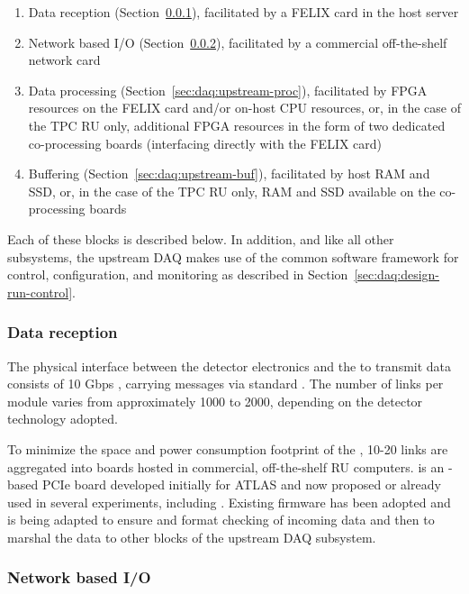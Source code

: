 \begin{enumerate}
\item Data reception (Section~\ref{sec:daq:upstream-receiver}), facilitated by a FELIX card in the host server
\item Network based I/O (Section~\ref{sec:daq:upstream-io}), facilitated by a commercial off-the-shelf network card
\item Data processing (Section~\ref{sec:daq:upstream-proc}), facilitated by FPGA resources on the FELIX
  card and/or on-host CPU resources, or, in the case of the TPC RU only,
  additional FPGA resources in the form of two dedicated co-processing
  boards (interfacing directly with the FELIX card)
\item Buffering (Section~\ref{sec:daq:upstream-buf}), facilitated by host RAM and SSD, or, in
  the case of the TPC RU only, RAM
  and SSD available on the co-processing boards
\end{enumerate}

Each of these blocks is described below. 
In addition, and like all other  subsystems, the upstream DAQ makes
use of the common software framework for control, configuration, and monitoring
as described in Section~\ref{sec:daq:design-run-control}.

\subsubsection{Data reception}
\label{sec:daq:upstream-receiver}
The physical interface between the detector electronics and the  to
transmit data consists of 10 Gbps , carrying messages via standard .
The number of links per  module varies from approximately 1000 to
2000, depending on the detector technology adopted.

To minimize the space and power consumption footprint of the , 10-20
links are aggregated into  boards hosted in commercial,
off-the-shelf RU computers.
 is an -based PCIe board developed initially for ATLAS
and now proposed or already used in several experiments, including
. 
Existing firmware has been adopted and is being adapted to ensure
 and
format checking of incoming data and then to marshal the data to other blocks of
the upstream DAQ subsystem.

\subsubsection{Network based I/O}
\label{sec:daq:upstream-io}

